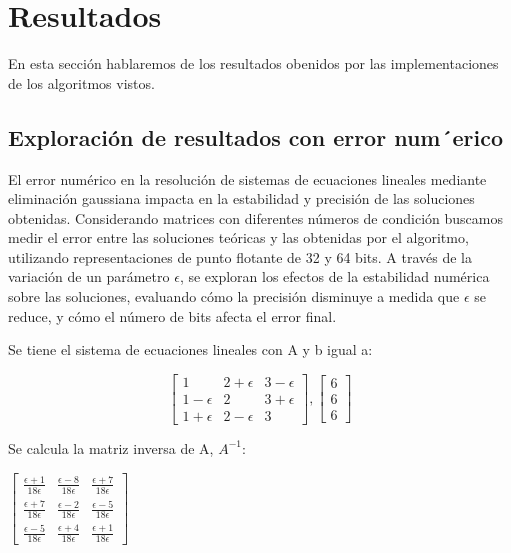 \section{Resultados}
\label{resultados}

En esta sección hablaremos de los resultados obenidos por las implementaciones de los algoritmos vistos.

\subsection{Exploración de resultados con error num´erico}

El error numérico en la resolución de sistemas de ecuaciones lineales mediante eliminación gaussiana impacta en la estabilidad y precisión de las soluciones obtenidas. Considerando matrices con diferentes números de condición buscamos medir el error entre las soluciones teóricas y las obtenidas por el algoritmo, utilizando representaciones de punto flotante de 32 y 64 bits. A través de la variación de un parámetro $\epsilon$, se exploran los efectos de la estabilidad numérica sobre las soluciones, evaluando cómo la precisión disminuye a medida que $\epsilon$ se reduce, y cómo el número de bits afecta el error final.

Se tiene el sistema de ecuaciones lineales con A y b igual a:

\[ \begin{bmatrix}
1 & 2+\epsilon & 3-\epsilon\\
1-\epsilon & 2 & 3+\epsilon\\
1+\epsilon & 2-\epsilon & 3
\end{bmatrix} ,
\begin{bmatrix}
6\\
6\\
6
\end{bmatrix}\]

Se calcula la matriz inversa de A, $A^{-1}$:
\begin{center}
$\begin{bmatrix}
\frac{\epsilon+1}{18\epsilon} & \frac{\epsilon-8}{18\epsilon} & \frac{\epsilon+7}{18\epsilon}\\
\frac{\epsilon+7}{18\epsilon} & \frac{\epsilon-2}{18\epsilon} & \frac{\epsilon-5}{18\epsilon}\\
\frac{\epsilon-5}{18\epsilon} & \frac{\epsilon+4}{18\epsilon} & \frac{\epsilon+1}{18\epsilon}
\end{bmatrix}$
\end{center}


